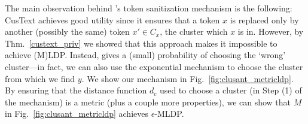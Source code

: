 The main observation behind \clusant's token sanitization mechanism is the following: CusText achieves good utility since it ensures that a token $x$ is replaced only by another (possibly the same) token $x' \in C_x$, the cluster which $x$ is in. However, by Thm.~\ref{custext_priv} we showed that this approach makes it impossible to achieve (M)LDP. Instead, \clusant gives a (small) probability of choosing the `wrong' cluster---in fact, we can also use the exponential mechanism to choose the cluster from which we find $y$. 
We show our mechanism in Fig.~\ref{fig:clusant_metricldp}.
%
By ensuring that the distance function $d_c$ used to choose a cluster (in Step (1) of the mechanism) is a metric (plus a couple more properties), we can show that $M$ in Fig.~\ref{fig:clusant_metricldp} achieves $\epsilon$-MLDP.



